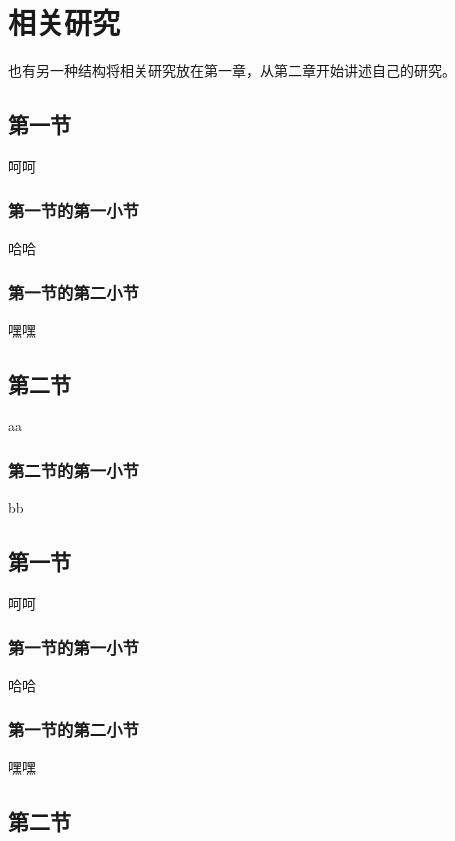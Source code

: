
\chapter{相关研究}

也有另一种结构将相关研究放在第一章，从第二章开始讲述自己的研究。

\section{第一节}

呵呵

\subsection{第一节的第一小节}

哈哈

\subsection{第一节的第二小节}

嘿嘿

\section{第二节}

aa

\subsection{第二节的第一小节}

bb

\section{第一节}

呵呵

\subsection{第一节的第一小节}

哈哈

\subsection{第一节的第二小节}

嘿嘿

\section{第二节}

